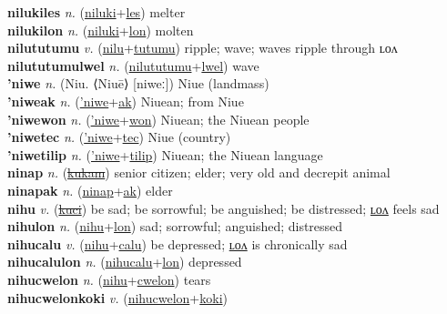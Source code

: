 \textbf{nilukiles} \textit{n.} (\hyperref[niluki]{niluki}+\hyperref[les]{les})
melter \label{nilukiles} \\
\textbf{nilukilon} \textit{n.} (\hyperref[niluki]{niluki}+\hyperref[lon]{lon})
molten \label{nilukilon} \\
\textbf{nilututumu} \textit{v.} (\hyperref[nilu]{nilu}+\hyperref[tutumu]{tutumu})
ripple; wave; waves ripple through ʟᴏᴧ \label{nilututumu} \\
\textbf{nilututumulwel} \textit{n.} (\hyperref[nilututumu]{nilututumu}+\hyperref[lwel]{lwel})
wave \label{nilututumulwel} \\
\textbf{'niwe} \textit{n.} (Niu. ⟨Niuē⟩ [niweː])
Niue (landmass) \label{'niwe} \\
\textbf{'niweak} \textit{n.} (\hyperref['niwe]{'niwe}+\hyperref[ak]{ak})
Niuean; from Niue \label{'niweak} \\
\textbf{'niwewon} \textit{n.} (\hyperref['niwe]{'niwe}+\hyperref[won]{won})
Niuean; the Niuean people \label{'niwewon} \\
\textbf{'niwetec} \textit{n.} (\hyperref['niwe]{'niwe}+\hyperref[tec]{tec})
Niue (country) \label{'niwetec} \\
\textbf{'niwetilip} \textit{n.} (\hyperref['niwe]{'niwe}+\hyperref[tilip]{tilip})
Niuean; the Niuean language \label{'niwetilip} \\
\textbf{ninap} \textit{n.} (\hyperref[kukam]{\sout{kukam}})
senior citizen; elder; very old and decrepit animal \label{ninap} \\
\textbf{ninapak} \textit{n.} (\hyperref[ninap]{ninap}+\hyperref[ak]{ak})
elder \label{ninapak} \\
\textbf{nihu} \textit{v.} (\hyperref[kuci]{\sout{kuci}})
be sad; be sorrowful; be anguished; be distressed; \hyperref[nihulon]{ʟᴏᴧ} feels sad \label{nihu} \\
\textbf{nihulon} \textit{n.} (\hyperref[nihu]{nihu}+\hyperref[lon]{lon})
sad; sorrowful; anguished; distressed \label{nihulon} \\
\textbf{nihucalu} \textit{v.} (\hyperref[nihu]{nihu}+\hyperref[calu]{calu})
be depressed; \hyperref[nihucalulon]{ʟᴏᴧ} is chronically sad \label{nihucalu} \\
\textbf{nihucalulon} \textit{n.} (\hyperref[nihucalu]{nihucalu}+\hyperref[lon]{lon})
depressed \label{nihucalulon} \\
\textbf{nihucwelon} \textit{n.} (\hyperref[nihu]{nihu}+\hyperref[cwelon]{cwelon})
tears \label{nihucwelon} \\
\textbf{nihucwelonkoki} \textit{v.} (\hyperref[nihucwelon]{nihucwelon}+\hyperref[koki]{koki})
